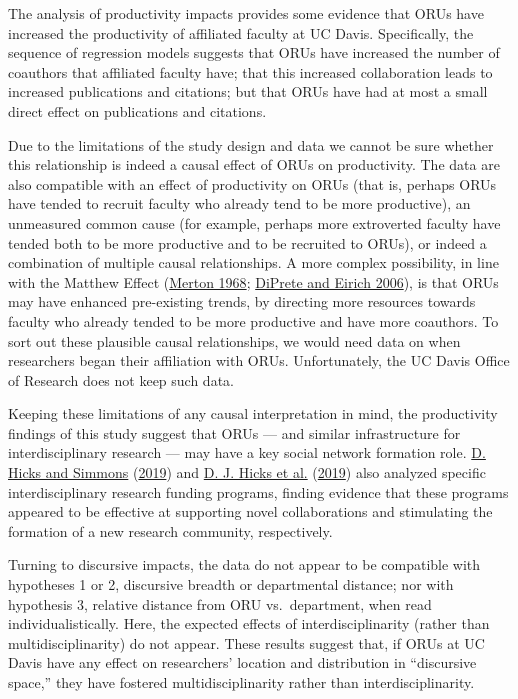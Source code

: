 \documentclass[
  11pt,
]{article}
\begin{document}
The analysis of productivity impacts provides some evidence that ORUs have increased the productivity of affiliated faculty at UC Davis. Specifically, the sequence of regression models suggests that ORUs have increased the number of coauthors that affiliated faculty have; that this increased collaboration leads to increased publications and citations; but that ORUs have had at most a small direct effect on publications and citations.

Due to the limitations of the study design and data we cannot be sure whether this relationship is indeed a causal effect of ORUs on productivity. The data are also compatible with an effect of productivity on ORUs (that is, perhaps ORUs have tended to recruit faculty who already tend to be more productive), an unmeasured common cause (for example, perhaps more extroverted faculty have tended both to be more productive and to be recruited to ORUs), or indeed a combination of multiple causal relationships. A more complex possibility, in line with the Matthew Effect (\protect\hyperlink{ref-MertonMatthewEffectScience1968}{Merton 1968}; \protect\hyperlink{ref-DiPreteCumulativeAdvantageMechanism2006}{DiPrete and Eirich 2006}), is that ORUs may have enhanced pre-existing trends, by directing more resources towards faculty who already tended to be more productive and have more coauthors. To sort out these plausible causal relationships, we would need data on when researchers began their affiliation with ORUs. Unfortunately, the UC Davis Office of Research does not keep such data.

Keeping these limitations of any causal interpretation in mind, the productivity findings of this study suggest that ORUs --- and similar infrastructure for interdisciplinary research --- may have a key social network formation role. \protect\hyperlink{ref-HicksNationalRoboticsInitiative2019}{D. Hicks and Simmons} (\protect\hyperlink{ref-HicksNationalRoboticsInitiative2019}{2019}) and \protect\hyperlink{ref-HicksNetworkAnalysisEvaluate2019}{D. J. Hicks et al.} (\protect\hyperlink{ref-HicksNetworkAnalysisEvaluate2019}{2019}) also analyzed specific interdisciplinary research funding programs, finding evidence that these programs appeared to be effective at supporting novel collaborations and stimulating the formation of a new research community, respectively.

Turning to discursive impacts, the data do not appear to be compatible with hypotheses 1 or 2, discursive breadth or departmental distance; nor with hypothesis 3, relative distance from ORU vs.~department, when read individualistically. Here, the expected effects of interdisciplinarity (rather than multidisciplinarity) do not appear. These results suggest that, if ORUs at UC Davis have any effect on researchers' location and distribution in ``discursive space,'' they have fostered multidisciplinarity rather than interdisciplinarity.
\end{document}
